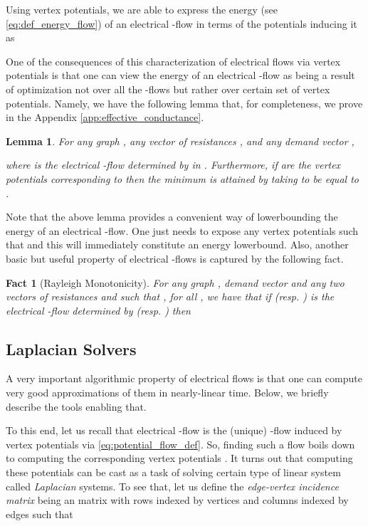 \documentclass[11pt, letterpaper]{article}
\newtheorem{lemma}[theorem]{Lemma}
\newtheorem{fact}[theorem]{Fact}
\begin{document}
Using vertex potentials, we are able to express the energy  (see \eqref{eq:def_energy_flow}) of an electrical -flow  in terms of the potentials  inducing it as


One of the consequences of this characterization of electrical flows via vertex potentials is that one can view the energy of an electrical -flow as being a result of optimization not over all the -flows but rather over certain set of vertex potentials. Namely, we have the following lemma that, for completeness, we prove in the Appendix \ref{app:effective_conductance}. 

\begin{lemma}\label{lem:effective_conductance}
For any graph , any vector of resistances , and any demand vector , 

where  is the electrical -flow determined by  in . Furthermore, if  are the vertex potentials corresponding to  then the minimum is attained by taking  to be equal to .
\end{lemma}

Note that the above lemma provides a convenient way of lowerbounding the energy of an electrical -flow. One just needs to expose any vertex potentials  such that  and this will immediately constitute an energy lowerbound. 
Also, another basic but useful property of electrical -flows is captured by the following fact.

\begin{fact}[Rayleigh Monotonicity]
\label{fa:rayleigh_monotonicity}
For any graph , demand vector  and any two vectors of resistances  and  such that , for all , we have that if  (resp. ) is the electrical -flow determined by  (resp. ) then

\end{fact}



\subsection{Laplacian Solvers}

A very important algorithmic property of electrical flows is that one can compute very good approximations of them in nearly-linear time. Below, we briefly describe the tools enabling that.

To this end, let us recall that electrical -flow is the (unique) -flow induced by vertex potentials via \eqref{eq:potential_flow_def}. So, finding such a flow boils down to computing the corresponding vertex potentials . It turns out that computing these potentials can be cast as a task of solving certain type of linear system called {\em Laplacian} systems. To see that, let us define the \emph{edge-vertex incidence matrix}  being an  matrix with rows indexed by vertices
  and columns indexed by edges such that
\end{document}
